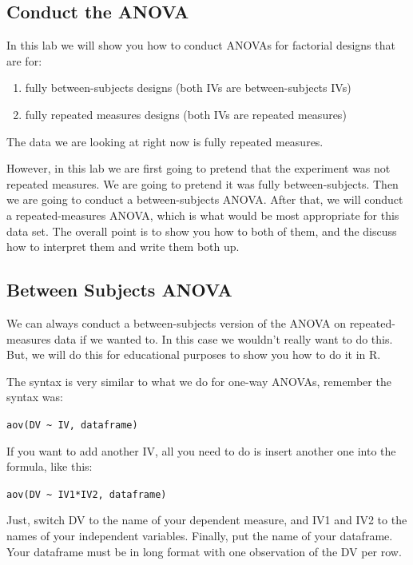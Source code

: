\documentclass[
]{book}
\providecommand{\tightlist}{%
  \setlength{\itemsep}{0pt}\setlength{\parskip}{0pt}}
\begin{document}
\hypertarget{conduct-the-anova-1}{%
\subsection{Conduct the ANOVA}\label{conduct-the-anova-1}}

In this lab we will show you how to conduct ANOVAs for factorial designs that are for:

\begin{enumerate}
\def\labelenumi{\arabic{enumi}.}
\tightlist
\item
  fully between-subjects designs (both IVs are between-subjects IVs)
\item
  fully repeated measures designs (both IVs are repeated measures)
\end{enumerate}

The data we are looking at right now is fully repeated measures.

However, in this lab we are first going to pretend that the experiment was not repeated measures. We are going to pretend it was fully between-subjects. Then we are going to conduct a between-subjects ANOVA. After that, we will conduct a repeated-measures ANOVA, which is what would be most appropriate for this data set. The overall point is to show you how to both of them, and the discuss how to interpret them and write them both up.

\hypertarget{between-subjects-anova}{%
\subsection{Between Subjects ANOVA}\label{between-subjects-anova}}

We can always conduct a between-subjects version of the ANOVA on repeated-measures data if we wanted to. In this case we wouldn't really want to do this. But, we will do this for educational purposes to show you how to do it in R.

The syntax is very similar to what we do for one-way ANOVAs, remember the syntax was:

\texttt{aov(DV\ \textasciitilde{}\ IV,\ dataframe)}

If you want to add another IV, all you need to do is insert another one into the formula, like this:

\texttt{aov(DV\ \textasciitilde{}\ IV1*IV2,\ dataframe)}

Just, switch DV to the name of your dependent measure, and IV1 and IV2 to the names of your independent variables. Finally, put the name of your dataframe. Your dataframe must be in long format with one observation of the DV per row.
\end{document}
